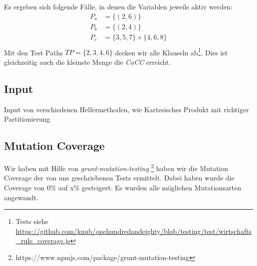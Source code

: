 \documentclass[ngerman]{article}
\begin{document}
Es ergeben sich folgende Fälle, in denen die Variablen jeweils aktiv werden:
\begin{align}
    P_a &= \{ (2, 6) \} \\
    P_b &= \{ (2, 4) \} \\
    P_c &= \{ 3, 5, 7 \} \times \{ 4, 6, 8 \} \\
\end{align}
Mit den Test Paths $TP = \{ 2, 3, 4, 6 \}$ decken wir alle Klauseln ab\footnote{Tests siehe \url{https://github.com/knub/onehundredandeighty/blob/testing/test/wirtschafts_rule_coverage.js}}.
Dies ist gleichzeitig auch die kleinste Menge die \emph{CaCC} erreicht.


\subsection{Input}
Input von verschiedenen Helfermethoden, wie Kartesisches Produkt mit richtiger Partitionierung


\subsection{Mutation Coverage}
Wir haben mit Hilfe von \emph{grunt-mutation-testing} \footnote{https://www.npmjs.com/package/grunt-mutation-testing} haben wir die Mutation Coverage der von uns geschriebenen Tests ermittelt.
Dabei haben wurde die Coverage von 0\% auf x\% gesteigert. Es wurden alle möglichen Mutationsarten angewandt.
\end{document}
